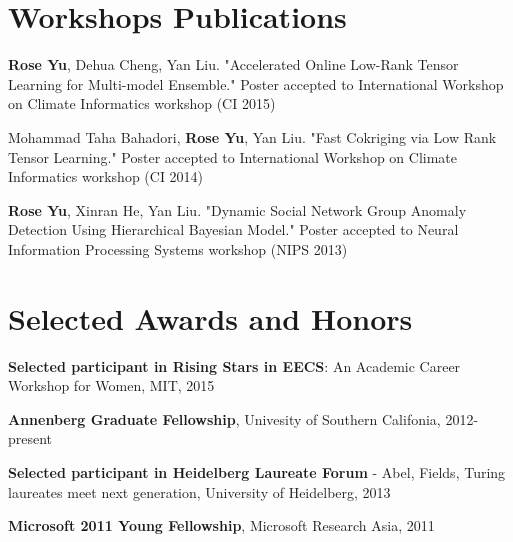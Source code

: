 \documentclass[margin,line]{res}
\begin{document}
\begin{resume}
\section{\sc Workshops Publications}
{\bf Rose Yu}, Dehua Cheng, Yan Liu. "Accelerated Online Low-Rank Tensor Learning for Multi-model Ensemble." Poster accepted to International Workshop on Climate Informatics workshop (CI 2015)

Mohammad Taha Bahadori, {\bf Rose Yu}, Yan Liu. "Fast Cokriging via Low Rank Tensor Learning." Poster accepted to International Workshop on Climate Informatics workshop (CI 2014)

{\bf Rose Yu}, Xinran He, Yan Liu. "Dynamic Social Network Group Anomaly Detection Using Hierarchical Bayesian Model." Poster accepted to Neural Information Processing Systems workshop (NIPS 2013)


\section{\sc Selected Awards and Honors} 


\textbf{Selected participant in Rising Stars in EECS}: An Academic Career Workshop for Women, MIT, 2015

\textbf{Annenberg Graduate Fellowship}, Univesity of Southern Califonia, 2012-present







%

\textbf{Selected participant in Heidelberg Laureate Forum }- Abel, Fields, Turing laureates meet next generation, University of Heidelberg, 2013


\textbf{Microsoft 2011 Young Fellowship}, Microsoft Research Asia, 2011


\end{resume}
\end{document}
